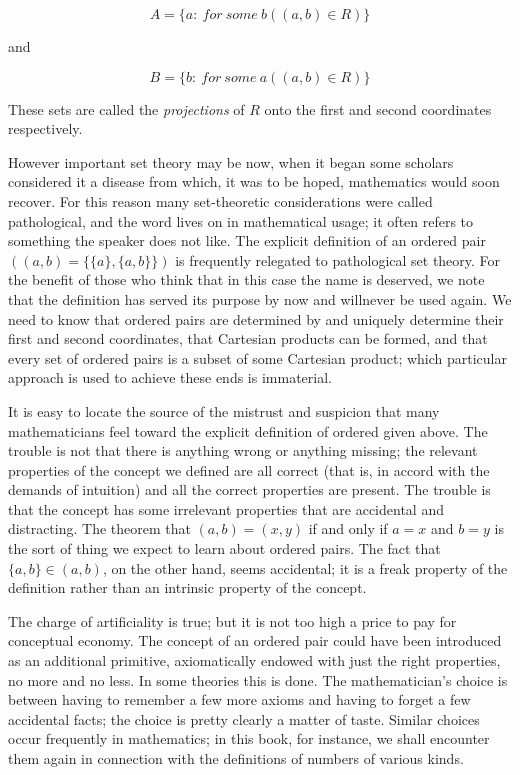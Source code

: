 \begin{equation*}
A = \{ a : \: for \: some \: b ((a,b) \in R) \}
\end{equation*}

and 

\begin{equation*}
B = \{ b : \: for \: some \: a ((a,b) \in R) \}
\end{equation*}

These sets are called the \textit{projections} of $R$ onto the first and second coordinates respectively.

However important set theory may be now, when it began some scholars considered it a disease from which, it was to be hoped, mathematics would soon recover. For this reason many set-theoretic considerations were called pathological, and the word lives on in mathematical usage; it often refers to something the speaker does not like. The explicit definition of an ordered pair $((a,b) = \{ \{ a \}, \{ a, b \} \})$ is frequently relegated to pathological set theory. For the benefit of those who think that in this case the name is deserved, we note that the definition has served its purpose by now and willnever be used again. We need to know that ordered pairs are determined by and uniquely determine their first and second coordinates, that Cartesian products can be formed, and that every set of ordered pairs is a subset of some Cartesian product; which particular approach is used to achieve these ends is immaterial. 

It is easy to locate the source of the mistrust and suspicion that many mathematicians feel toward the explicit definition of ordered given above. The trouble is not that there is anything wrong or anything missing; the relevant properties of the concept we defined are all correct (that is, in accord with the demands of intuition) and all the correct properties are present. The trouble is that the concept has some irrelevant properties that are accidental and  distracting. The theorem that $(a, b) = (x, y)$ if and only if $a = x$ and $b = y$ is the sort of thing we expect to learn about ordered pairs. The fact that $\{ a, b \} \in (a,b) $, on the other hand, seems accidental; it is a freak property of the definition rather than an intrinsic property of the concept.

The charge of artificiality is true; but it is not too high a price to pay for conceptual economy. The concept of an ordered pair could have been introduced as an additional primitive, axiomatically endowed with just the right properties, no more and no less. In some theories this is done. The mathematician's choice is between having to remember a few more axioms and having to forget a few accidental facts; the choice is pretty clearly a matter of taste. Similar choices occur frequently in mathematics; in this book, for instance, we shall encounter them again in connection with the definitions of numbers of various kinds. 

